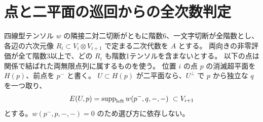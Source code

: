 \section{点と二平面の巡回からの全次数判定}
\label{sec:point-line-flag-cycles}
四線型テンソル $w$ の隣接二対二切断がともに階数6、一文字切断が全階数とし、
各辺の六次元像 $R_i\subset V_i\otimes V_{i+1}$ で定まる二次代数を $A$ とする。
両向きの非零評価が全て階数3以上で、どの $R_i$ も階数1テンソルを含まないとする。
以下の点は関係で結ばれた両無限点列に属するものを使う。
位置 $i$ の点 $p$ の消滅超平面を $H(p)$、前点を $p^-$ と書く。
$U\subset H(p)$ が二平面なら、$U^\perp$ で $p$ から独立な $q$ を一つ取り、
\[
 E(U,p)=\operatorname{supp}_{\rm left}w(p^-,q,-,-)\ \subset V_{i+1}
\]
とする。$w(p^-,p,-,-)=0$ のため選び方に依存しない。

